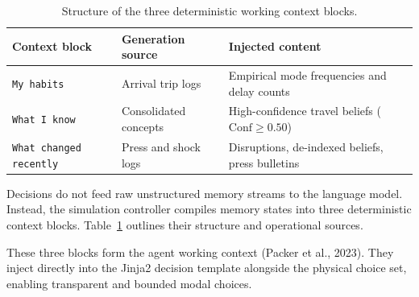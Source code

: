 \begin{table}[h]
\centering
\caption{Structure of the three deterministic working context blocks.}
\label{tab-working_context}
\small
\begin{tabular}{lll}
\toprule
\textbf{Context block} & \textbf{Generation source} & \textbf{Injected content} \\
\midrule
\texttt{My habits} & Arrival trip logs & Empirical mode frequencies and delay counts \\
\texttt{What I know} & Consolidated concepts & High-confidence travel beliefs ($\text{Conf} \ge 0.50$) \\
\texttt{What changed recently} & Press and shock logs & Disruptions, de-indexed beliefs, press bulletins \\
\bottomrule
\end{tabular}
\end{table}

Decisions do not feed raw unstructured memory streams to the language model. Instead, the simulation controller compiles memory states into three deterministic context blocks. Table~\ref{tab-working_context} outlines their structure and operational sources.

These three blocks form the agent working context (Packer et al., 2023). They inject directly into the Jinja2 decision template alongside the physical choice set, enabling transparent and bounded modal choices.
